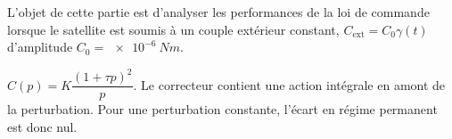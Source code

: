 L’objet de cette partie est d’analyser les performances de la loi de commande lorsque le satellite est soumis à
un couple extérieur constant, $C_{\text{ext}}= C_0 \gamma(t)$ d’amplitude $C_0 =\SI{e-6}{Nm}$.

\ifprof
\begin{corrige}
$C(p)=K\dfrac{\left(1+\tau p\right)^2}{p}$. Le correcteur contient une action intégrale en amont de la perturbation. Pour une perturbation constante, l'écart en régime permanent est donc nul.
\end{corrige}
\else
\fi
%
%
%
%
%
%
%
%
%
